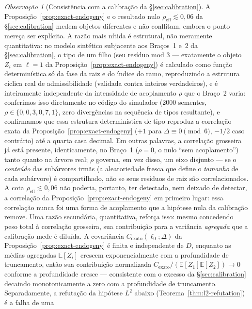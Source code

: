 \documentclass[11pt]{article}
\theoremstyle{definition}
\theoremstyle{remark}
\newtheorem{remark}[theorem]{Observação}
\begin{document}
\begin{remark}[Consistência com a calibração da \S\ref{sec:calibration}]
\label{rem:calibration-consistency}
A Proposição~\ref{prop:exact-endogeny} e o resultado nulo
$\rho_{\mathrm{eff}}\lesssim 0{,}06$ da \S\ref{sec:calibration} medem
objetos diferentes e não conflitam, embora o ponto mereça ser explícito.
A razão mais nítida é estrutural, não meramente quantitativa: no
modelo sintético subjacente aos Braços~1 e~2 da \S\ref{sec:calibration},
o tipo de um filho (seu resíduo mod $3$ --- exatamente o objeto
$Z_i$ em $\ell=1$ da Proposição~\ref{prop:exact-endogeny}) é calculado
como função determinística só da fase da raiz e do índice do ramo,
reproduzindo a estrutura cíclica real de admissibilidade (validada
contra inteiros verdadeiros), e é inteiramente independente da
intensidade de acoplamento $\rho$ que o Braço~2 varia: conferimos isso
diretamente no código do simulador (2000 sementes,
$\rho\in\{0,0{,}3,0{,}7,1\}$, zero divergências na sequência de tipos
resultante), e confirmamos que essa estrutura determinística de tipo
reproduz a correlação exata da Proposição~\ref{prop:exact-endogeny}
($+1$ para $\Delta\equiv0\pmod6$, $-1/2$ caso contrário) até a quarta
casa decimal. Em outras palavras, a correlação grosseira já está
presente, identicamente, no Braço~1 ($\rho=0$, o nulo ``sem
acoplamento'') tanto quanto na árvore real; $\rho$ governa, em vez
disso, um eixo disjunto --- se o \emph{conteúdo} das subárvores irmãs
(a aleatoriedade fresca que define o \emph{tamanho} de cada subárvore)
é compartilhado, não se seus resíduos de raiz são correlacionados. A
cota $\rho_{\mathrm{eff}}\lesssim0{,}06$ não poderia, portanto, ter
detectado, nem deixado de detectar, a correlação da
Proposição~\ref{prop:exact-endogeny} em primeiro lugar: essa
correlação nunca foi uma forma de acoplamento que a hipótese nula da
calibração remove. Uma razão secundária, quantitativa, reforça isso:
mesmo concedendo peso total à correlação grosseira, sua contribuição
para a variância \emph{agregada} que a calibração mede é diluída. A
covariância $C_{\mathrm{exato}}(\ell_0;\Delta)$ da
Proposição~\ref{prop:exact-endogeny} é finita e independente de $D$,
enquanto as médias agregadas $\mathbb{E}[Z_i]$ crescem
exponencialmente com a profundidade de truncamento, então sua
contribuição normalizada
$C_{\mathrm{exato}}/(\mathbb{E}[Z_1]\mathbb{E}[Z_2])\to0$ conforme a
profundidade cresce --- consistente com o excesso da
\S\ref{sec:calibration} decaindo monotonicamente a zero com a
profundidade de truncamento. Separadamente, a refutação da hipótese
$L^2$ abaixo (Teorema~\ref{thm:l2-refutation}) é a falha de uma

\end{remark}
\end{document}

